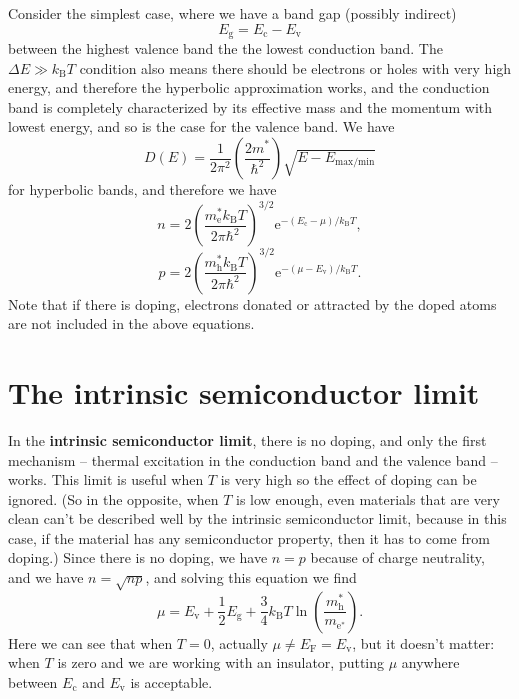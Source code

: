\documentclass[hyperref, a4paper]{article}
\newcommand*{\ee}{\mathrm{e}}
\newcommand*{\concept}[1]{{\textbf{#1}}}
\begin{document}
Consider the simplest case, where we have a band gap (possibly indirect) 
\begin{equation}
    E_{\text{g}} = E_{\text{c}} - E_{\text{v}}
\end{equation}
between the highest valence band the the lowest conduction band.
The $\Delta E \gg k_{\text{B}} T$ condition also means there should be 
electrons or holes with very high energy,
and therefore the hyperbolic approximation works, 
and the conduction band is completely characterized by its effective mass 
and the momentum with lowest energy,
and so is the case for the valence band.
We have 
\begin{equation}
    D(E) = \frac{1}{2 \pi^2} \left( \frac{2 m^*}{\hbar^2} \right) \sqrt{E - E_{\text{max/min}}}
\end{equation}
for hyperbolic bands,
and therefore we have 
\begin{equation}
    n = 2 \left( \frac{m_\text{e}^* k_{\text{B}} T}{2 \pi \hbar^2} \right)^{3/2} 
    \ee^{- (E_{\text{c}} - \mu) / k_{\text{B}} T},
\end{equation}
\begin{equation}
    p = 2 \left( \frac{m_\text{h}^* k_{\text{B}} T}{2 \pi \hbar^2} \right)^{3/2} 
    \ee^{- (\mu - E_{\text{v}}) / k_{\text{B}} T}.
\end{equation}
Note that if there is doping, electrons donated or attracted by the doped atoms 
are not included in the above equations.

\section{The intrinsic semiconductor limit}

In the \concept{intrinsic semiconductor limit},
there is no doping, and only the first mechanism 
-- thermal excitation in the conduction band and the valence band --
works. 
This limit is useful 
when $T$ is very high so the effect of doping can be ignored.
(So in the opposite, 
when $T$ is low enough, 
even materials that are very clean can't be described well by the intrinsic semiconductor limit,
because in this case, if the material has any semiconductor property,
then it has to come from doping.)
Since there is no doping, we have $n = p$ because of charge neutrality,
and we have $n = \sqrt{np}$,
and solving this equation we find 
\begin{equation}
    \mu = E_{\text{v}} + \frac{1}{2} E_{\text{g}} + \frac{3}{4} k_{\text{B}} T \ln(\frac{m_\text{h}^*}{m_{\text{e}^*}}).
\end{equation}
Here we can see that when $T = 0$, 
actually $\mu \neq E_{\text{F}} = E_{\text{v}}$,
but it doesn't matter:
when $T$ is zero and we are working with an insulator,
putting $\mu$ anywhere between $E_{\text{c}}$ and $E_{\text{v}}$ is acceptable.
\end{document}

